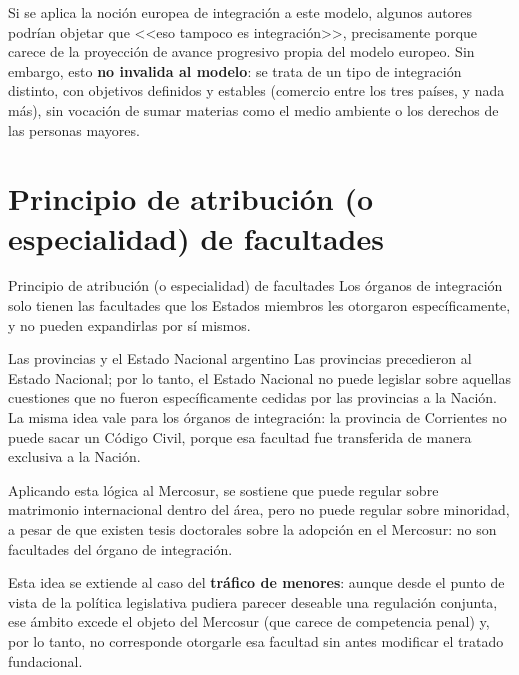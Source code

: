 \documentclass[12pt,oneside]{book}
\begin{document}
Si se aplica la noción europea de integración a este modelo, algunos autores podrían objetar que <<eso tampoco es integración>>, precisamente porque carece de la proyección de avance progresivo propia del modelo europeo. Sin embargo, esto \textbf{no invalida al modelo}: se trata de un tipo de integración distinto, con objetivos definidos y estables (comercio entre los tres países, y nada más), sin vocación de sumar materias como el medio ambiente o los derechos de las personas mayores.

\section{Principio de atribución (o especialidad) de facultades}

\begin{definition}{Principio de atribución (o especialidad) de facultades}
Los órganos de integración solo tienen las facultades que los Estados miembros les otorgaron específicamente, y no pueden expandirlas por sí mismos.
\end{definition}

\begin{example}{Las provincias y el Estado Nacional argentino}
Las provincias precedieron al Estado Nacional; por lo tanto, el Estado Nacional no puede legislar sobre aquellas cuestiones que no fueron específicamente cedidas por las provincias a la Nación. La misma idea vale para los órganos de integración: la provincia de Corrientes no puede sacar un Código Civil, porque esa facultad fue transferida de manera exclusiva a la Nación.
\end{example}

Aplicando esta lógica al Mercosur, se sostiene que puede regular sobre matrimonio internacional dentro del área, pero no puede regular sobre minoridad, a pesar de que existen tesis doctorales sobre la adopción en el Mercosur: no son facultades del órgano de integración.

Esta idea se extiende al caso del \textbf{tráfico de menores}: aunque desde el punto de vista de la política legislativa pudiera parecer deseable una regulación conjunta, ese ámbito excede el objeto del Mercosur (que carece de competencia penal) y, por lo tanto, no corresponde otorgarle esa facultad sin antes modificar el tratado fundacional.
\end{document}
